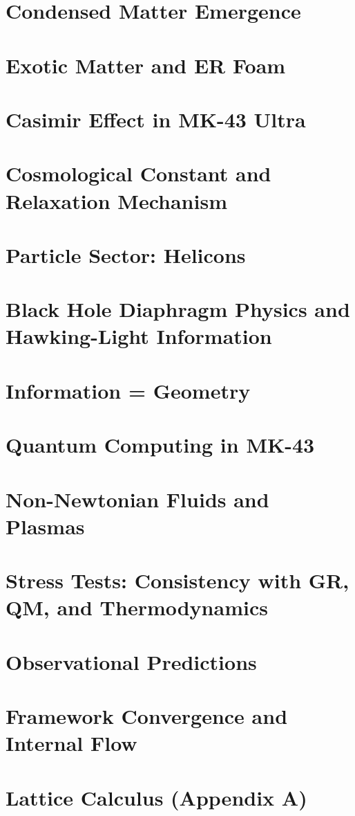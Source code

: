 \chapter{Condensed Matter Emergence}
\chapter{Exotic Matter and ER Foam}
\chapter{Casimir Effect in MK-43 Ultra}
\chapter{Cosmological Constant and Relaxation Mechanism}
\chapter{Particle Sector: Helicons}
\chapter{Black Hole Diaphragm Physics and Hawking-Light Information}
\chapter{Information = Geometry}
\chapter{Quantum Computing in MK-43}
\chapter{Non-Newtonian Fluids and Plasmas}
\chapter{Stress Tests: Consistency with GR, QM, and Thermodynamics}
\chapter{Observational Predictions}
\chapter{Framework Convergence and Internal Flow}

\appendix

\chapter{Lattice Calculus (Appendix A)}
